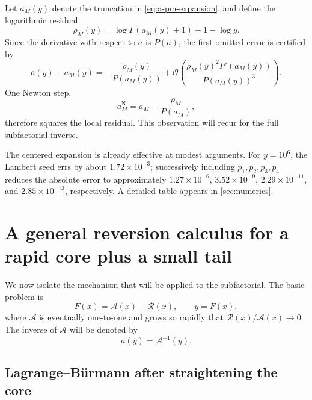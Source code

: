 \documentclass[11pt,a4paper]{article}
\numberwithin{equation}{section}
\theoremstyle{definition}
\theoremstyle{remark}
\newcommand{\Ord}{\mathcal O}
\newcommand{\Core}{\mathcal A}
\newcommand{\InvCore}{\mathfrak a}
\newcommand{\Res}{\mathcal R}
\begin{document}
Let $a_M(y)$ denote the truncation in \eqref{eq:a-pm-expansion}, and define
the logarithmic residual
\begin{equation}\label{eq:gamma-residual}
 \rho_M(y)=\log\Gamma(a_M(y)+1)-1-\log y.
\end{equation}
Since the derivative with respect to $a$ is $P(a)$, the first omitted error
is certified by
\begin{equation}\label{eq:gamma-error-residual}
 \InvCore(y)-a_M(y)
 =-\frac{\rho_M(y)}{P(a_M(y))}
 +\Ord\!\left(\frac{\rho_M(y)^2P'(a_M(y))}{P(a_M(y))^3}\right).
\end{equation}
One Newton step,
\begin{equation}\label{eq:gamma-Newton}
 a_M^{\mathrm N}=a_M-\frac{\rho_M}{P(a_M)},
\end{equation}
therefore squares the local residual.  This observation will recur for the
full subfactorial inverse.

\begin{checkpointbox}
The centered expansion is already effective at modest arguments.  For
$y=10^6$, the Lambert seed errs by about $1.72\times10^{-3}$; successively
including $p_1,p_2,p_3,p_4$ reduces the absolute error to approximately
$1.27\times10^{-6}$, $3.52\times10^{-9}$,
$2.29\times10^{-11}$, and $2.85\times10^{-13}$, respectively.  A detailed
table appears in \cref{sec:numerics}.
\end{checkpointbox}

\section{A general reversion calculus for a rapid core plus a small tail}
\label{sec:general-calculus}

We now isolate the mechanism that will be applied to the subfactorial.  The
basic problem is
\begin{equation}\label{eq:general-F}
 F(x)=\Core(x)+\Res(x),
 \qquad y=F(x),
\end{equation}
where $\Core$ is eventually one-to-one and grows so rapidly that
$\Res(x)/\Core(x)\to0$.  The inverse of $\Core$ will be denoted by
\begin{equation}\label{eq:general-a}
 a(y)=\Core^{-1}(y).
\end{equation}

\subsection{Lagrange--B\"urmann after straightening the core}
\end{document}
